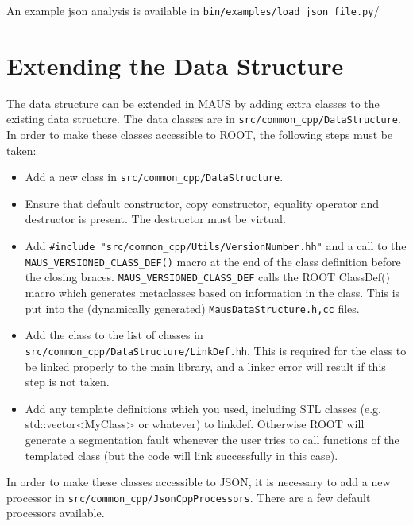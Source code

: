 An example json analysis is available in \verb|bin/examples/load_json_file.py|/

\section{Extending the Data Structure}
The data structure can be extended in MAUS by adding extra classes to the existing data structure. The data classes are in \verb|src/common_cpp/DataStructure|. In order to make these classes accessible to ROOT, the following steps must be taken:
\begin{itemize}
\item Add a new class in \verb|src/common_cpp/DataStructure|.
\item Ensure that default constructor, copy constructor, equality operator and destructor is present. The destructor must be virtual.
\item Add \verb|#include "src/common_cpp/Utils/VersionNumber.hh"| and a call to the \verb|MAUS_VERSIONED_CLASS_DEF()| macro at the end of the class definition before the closing braces. \verb|MAUS_VERSIONED_CLASS_DEF| calls the ROOT ClassDef() macro which generates metaclasses based on information in the class. This is put into the (dynamically generated) \verb|MausDataStructure.h,cc| files.
\item Add the class to the list of classes in \verb|src/common_cpp/DataStructure/LinkDef.hh|. This is required for the class to be linked properly to the main library, and a linker error will result if this step is not taken.
\item Add any template definitions which you used, including STL classes (e.g. std::vector<MyClass> or whatever) to linkdef. Otherwise ROOT will generate a segmentation fault whenever the user tries to call functions of the templated class (but the code will link successfully in this case).
\end{itemize}
In order to make these classes accessible to JSON, it is necessary to add a new processor in \verb|src/common_cpp/JsonCppProcessors|. There are a few default processors available.
